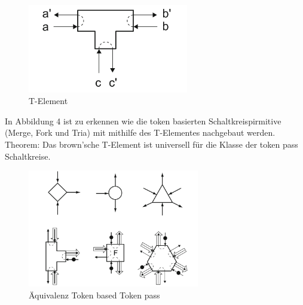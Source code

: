 \documentclass[11pt,a4paper]{article}
\begin{document}
\begin{figure}[h]
    \centering
    \includegraphics[width=7cm]{bilder/T_Element.png}
    \caption{T-Element}
\end{figure}    

In Abbildung 4 ist zu erkennen wie die token basierten Schaltkreispirmitive 
(Merge, Fork und Tria) mit mithilfe des T-Elementes nachgebaut werden.
%
Theorem: Das brown'sche T-Element ist universell für die Klasse der token pass 
Schaltkreise.

\begin{figure}[h]
    \centering 
    \centering
    \includegraphics[width=7.5cm]{bilder/BasedToPass.png}
    \caption{Äquivalenz Token based Token pass}
\end{figure}
\end{document}
